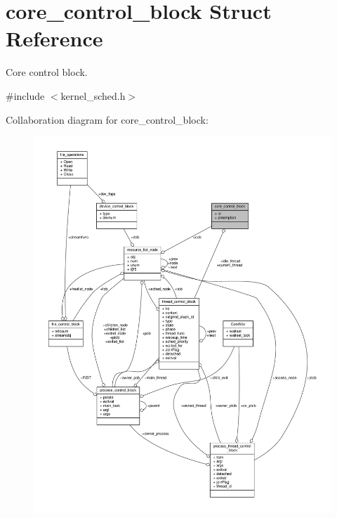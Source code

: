 \hypertarget{structcore__control__block}{}\section{core\+\_\+control\+\_\+block Struct Reference}
\label{structcore__control__block}


Core control block.  




{\ttfamily \#include $<$kernel\+\_\+sched.\+h$>$}



Collaboration diagram for core\+\_\+control\+\_\+block\+:
\nopagebreak
\begin{figure}[H]
\begin{center}
\leavevmode
\includegraphics[width=350pt]{structcore__control__block__coll__graph}
\end{center}
\end{figure}
